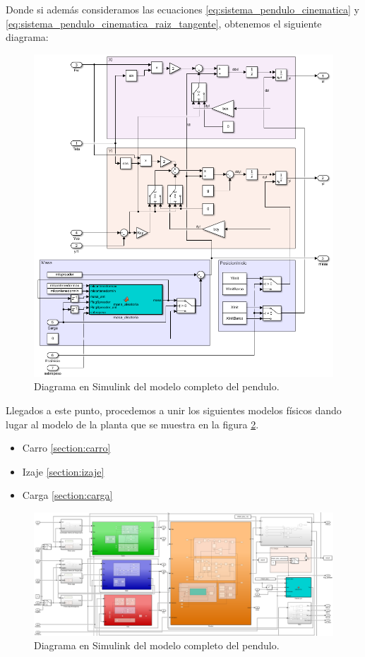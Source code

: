 \documentclass[11pt]{article}
\begin{document}
Donde si además consideramos las ecuaciones \ref{eq:sistema_pendulo_cinematica} y \ref{eq:sistema_pendulo_cinematica_raiz_tangente}, obtenemos el siguiente diagrama:

\begin{figure}[h!]
	\centering
	\includegraphics[width=1\textwidth]{images/imagen_10_sistema_pendulo_cinematica_dinamica.png}
	\caption{Diagrama en Simulink del modelo completo del pendulo.}
	\label{fig:sistema_pendulo_cinematica_dinamica}
\end{figure}

\newpage

Llegados a este punto, procedemos a unir los siguientes modelos físicos dando lugar al modelo de la planta que se muestra en la figura \ref{fig:sistema_completo}.
\begin{itemize}
	\item Carro \ref{section:carro}
	\item Izaje \ref{section:izaje}
	\item Carga \ref{section:carga}
\end{itemize}

\begin{figure}[h!]
	\centering
	\includegraphics[width=1\textwidth]{images/imagen_11_sistema_completo.png}
	\caption{Diagrama en Simulink del modelo completo del pendulo.}
	\label{fig:sistema_completo}
\end{figure}
\end{document}
